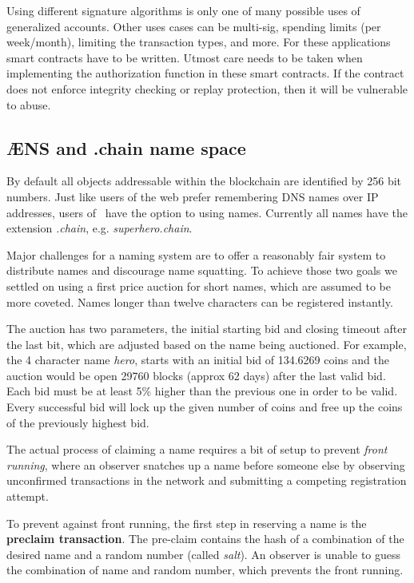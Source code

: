 Using different signature algorithms is only one of many possible uses
of generalized accounts. Other uses cases can be multi-sig, spending
limits (per week/month), limiting the transaction types, and more. For
these applications smart contracts have to be written. Utmost care
needs to be taken when implementing the authorization
function in these smart contracts. If the contract does not enforce
integrity checking or replay protection, then it will be vulnerable to
abuse.



\subsection{ÆNS and .chain name space}
\label{sect:aens}

By default all objects addressable within the blockchain are identified by
256 bit numbers. Just like users of the web prefer remembering DNS names over
IP addresses, users of \aet\ have the option to using names. Currently all
names have the extension \textit{.chain}, e.g. \textit{superhero.chain}.

Major challenges for a naming system are to offer a reasonably fair system to
distribute names and discourage name squatting. To achieve those two goals we
settled on using a first price auction for short names, which are assumed to be
more coveted. Names longer than twelve characters can be registered instantly.

The auction has two parameters, the initial starting bid and closing timeout
after the last bit, which are adjusted based on the name being auctioned.
For example, the 4 character name \textit{hero}, starts with an initial
bid of 134.6269 coins and the auction would be open 29760 blocks (approx 62
days) after the last valid bid.
Each bid must be at least 5\% higher than the previous one in order to be
valid. Every successful bid will lock up the given number of coins and free
up the coins of the previously highest bid.

The actual process of claiming a name requires a bit of setup to prevent
\textit{front running}, where an observer snatches up a name before someone
else by observing unconfirmed transactions in the network and submitting a
competing registration attempt.

To prevent against front running, the first step in reserving a name is the
\textbf{preclaim transaction}. The pre-claim contains the hash of a combination
of the desired name and a random number (called \textit{salt}). An observer is
unable to guess the combination of name and random number, which prevents the
front running.

